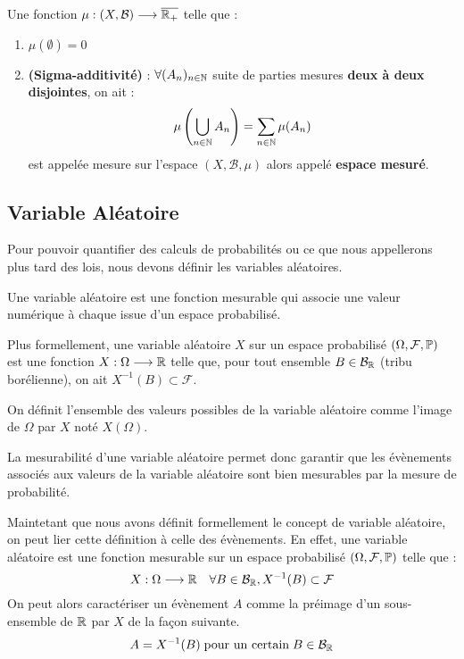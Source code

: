 \begin{remark}
    Une fonction $ \mu : (X, \mathcal{B}) \longrightarrow \overline{\mathbb{R}_+}$ telle que : 
    \begin{enumerate}
        \item $ \mu(\emptyset) = 0 $ 
        \item \textbf{(Sigma-additivité)} : $ \forall (A_n)_{n \in \mathbb{N}}$ suite de parties mesures \textbf{deux à deux disjointes}, on ait : 
            \[ \mu \left( \bigcup_{n \in \mathbb{N}} A_n \right) = \sum_{n \in \mathbb{N}} \mu(A_n) \]
        est appelée mesure sur l'espace $(X, \mathcal{B}, \mu)$ alors appelé \textbf{espace mesuré}. 
    \end{enumerate}
\end{remark}

\subsection{Variable Aléatoire}

Pour pouvoir quantifier des calculs de probabilités ou ce que nous appellerons plus tard des lois, nous devons définir 
les variables aléatoires. 

\begin{definition}
    Une variable aléatoire est une fonction mesurable qui associe une valeur numérique à chaque issue d'un espace probabilisé. 

    \vspace{0.5cm}

    Plus formellement, une variable aléatoire $X$ sur un espace probabilisé $(\Omega, \mathcal{F}, \mathbb{P})$ 
    est une fonction $ X : \Omega \longrightarrow \mathbb{R}$ telle que, pour tout ensemble $B \in \mathcal{B}_{\mathbb{R}}$ (tribu borélienne), 
    on ait $X^{-1} (B) \subset \mathcal{F}$. 

    \vspace{0.5cm}

    On définit l'ensemble des valeurs possibles de la variable aléatoire comme l'image de $\Omega$ par $X$ noté $X(\Omega)$. 
\end{definition}

La mesurabilité d'une variable aléatoire permet donc garantir que les évènements associés aux valeurs de la variable 
aléatoire sont bien mesurables par la mesure de probabilité. 

\begin{proposition}
    Maintetant que nous avons définit formellement le concept de variable aléatoire, on peut lier cette définition 
    à celle des évènements. En effet, une variable aléatoire est une fonction mesurable sur un espace probabilisé $(\Omega, \mathcal{F}, \mathbb{P})$
    telle que : 
        \[ X : \Omega \longrightarrow \mathbb{R} \quad \forall B \in \mathcal{B}_{\mathbb{R}}, X^{-1} (B) \subset \mathcal{F} \] 
    On peut alors caractériser un évènement $A$ comme la préimage d'un sous-ensemble de $\mathbb{R}$ par $X$ de la façon suivante. 
        \[ A = X^{-1}(B) \; \text{pour un certain} \; B \in \mathcal{B}_{\mathbb{R}} \] 
\end{proposition}


